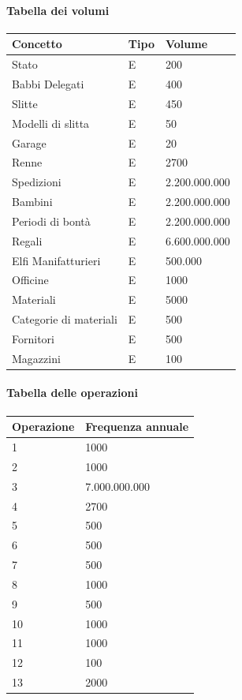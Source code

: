 \documentclass[12pt]{report}
\begin{document}
\paragraph{Tabella dei volumi}
\begin{center}
\begin{tabular}{|p{}|p{}|p{}|}
\hline
\textbf{Concetto} & \textbf{Tipo} & \textbf{Volume} \\
\hline
Stato & E & 200 \\
\hline
Babbi Delegati & E & 400 \\
\hline
Slitte & E & 450 \\
\hline
Modelli di slitta & E & 50 \\
\hline
Garage & E & 20 \\
\hline
Renne & E & 2700 \\
\hline
Spedizioni & E & 2.200.000.000 \\
\hline
Bambini & E & 2.200.000.000 \\
\hline
Periodi di bontà & E & 2.200.000.000 \\
\hline
Regali & E & 6.600.000.000 \\
\hline
Elfi Manifatturieri & E & 500.000 \\
\hline
Officine & E & 1000 \\
\hline
Materiali & E & 5000 \\
\hline
Categorie di materiali & E & 500 \\
\hline
Fornitori & E & 500 \\
\hline
Magazzini & E & 100 \\
\hline
\end{tabular}
\end{center}

\paragraph{Tabella delle operazioni}
\begin{center}
\begin{tabular}{|p{}|p{}|}
\hline
\textbf{Operazione} & \textbf{Frequenza annuale} \\
\hline
1 & 1000 \\
\hline
2 & 1000 \\
\hline
3 & 7.000.000.000 \\
\hline
4 & 2700 \\
\hline
5 & 500 \\
\hline
6 & 500 \\
\hline
7 & 500 \\
\hline
8 & 1000 \\
\hline
9 & 500 \\
\hline
10 & 1000 \\
\hline
11 & 1000 \\
\hline
12 & 100 \\
\hline
13 & 2000 \\
\hline
\end{tabular}
\end{center}
\end{document}

